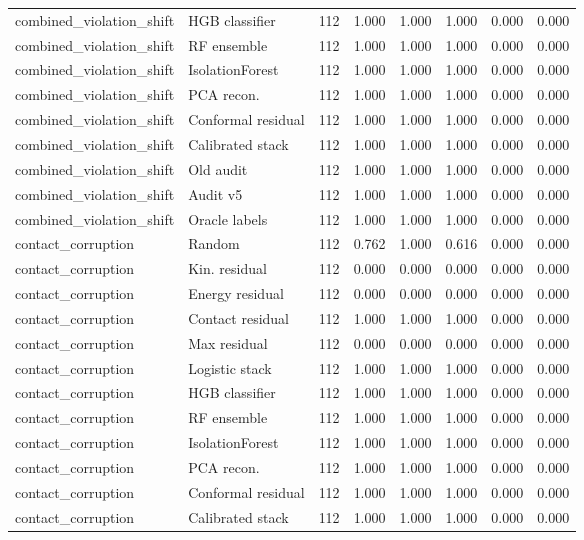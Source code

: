 {\begin{longtable}{llrrrrrr}
combined\_violation\_shift & HGB classifier & 112 & 1.000 & 1.000 & 1.000 & 0.000 & 0.000 \\
combined\_violation\_shift & RF ensemble & 112 & 1.000 & 1.000 & 1.000 & 0.000 & 0.000 \\
combined\_violation\_shift & IsolationForest & 112 & 1.000 & 1.000 & 1.000 & 0.000 & 0.000 \\
combined\_violation\_shift & PCA recon. & 112 & 1.000 & 1.000 & 1.000 & 0.000 & 0.000 \\
combined\_violation\_shift & Conformal residual & 112 & 1.000 & 1.000 & 1.000 & 0.000 & 0.000 \\
combined\_violation\_shift & Calibrated stack & 112 & 1.000 & 1.000 & 1.000 & 0.000 & 0.000 \\
combined\_violation\_shift & Old audit & 112 & 1.000 & 1.000 & 1.000 & 0.000 & 0.000 \\
combined\_violation\_shift & Audit v5 & 112 & 1.000 & 1.000 & 1.000 & 0.000 & 0.000 \\
combined\_violation\_shift & Oracle labels & 112 & 1.000 & 1.000 & 1.000 & 0.000 & 0.000 \\
contact\_corruption & Random & 112 & 0.762 & 1.000 & 0.616 & 0.000 & 0.000 \\
contact\_corruption & Kin. residual & 112 & 0.000 & 0.000 & 0.000 & 0.000 & 0.000 \\
contact\_corruption & Energy residual & 112 & 0.000 & 0.000 & 0.000 & 0.000 & 0.000 \\
contact\_corruption & Contact residual & 112 & 1.000 & 1.000 & 1.000 & 0.000 & 0.000 \\
contact\_corruption & Max residual & 112 & 0.000 & 0.000 & 0.000 & 0.000 & 0.000 \\
contact\_corruption & Logistic stack & 112 & 1.000 & 1.000 & 1.000 & 0.000 & 0.000 \\
contact\_corruption & HGB classifier & 112 & 1.000 & 1.000 & 1.000 & 0.000 & 0.000 \\
contact\_corruption & RF ensemble & 112 & 1.000 & 1.000 & 1.000 & 0.000 & 0.000 \\
contact\_corruption & IsolationForest & 112 & 1.000 & 1.000 & 1.000 & 0.000 & 0.000 \\
contact\_corruption & PCA recon. & 112 & 1.000 & 1.000 & 1.000 & 0.000 & 0.000 \\
contact\_corruption & Conformal residual & 112 & 1.000 & 1.000 & 1.000 & 0.000 & 0.000 \\
contact\_corruption & Calibrated stack & 112 & 1.000 & 1.000 & 1.000 & 0.000 & 0.000 \\

\end{longtable}}
